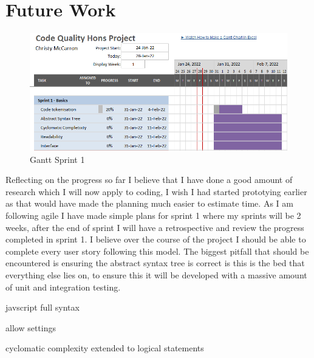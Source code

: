 \section{Future Work}
\begin{figure}
    \includegraphics[width=.2\textwidth]{images/gantt.png}
    \caption{Gantt Sprint 1}
    \label{fig:gantt}
  \end{figure}
  Reflecting on the progress so far I believe that I have done a good amount of research which I will now apply to coding, I wish I had started prototying earlier as that would have made the planning much easier to estimate time.
  \newline
  As I am following agile I have made simple plans for sprint 1 where my sprints will be 2 weeks, after the end of sprint I will have a retrospective and review the progress completed in sprint 1.
  \newline
  I believe over the course of the project I should be able to complete every user story following this model.
  \newline
  The biggest pitfall that should be encountered is ensuring the abstract syntax tree is correct is this is the bed that everything else lies on, to ensure this it will be developed with a massive amount of unit and integration testing.


  javscript full syntax

  allow settings 

  cyclomatic complexity extended to logical statements 